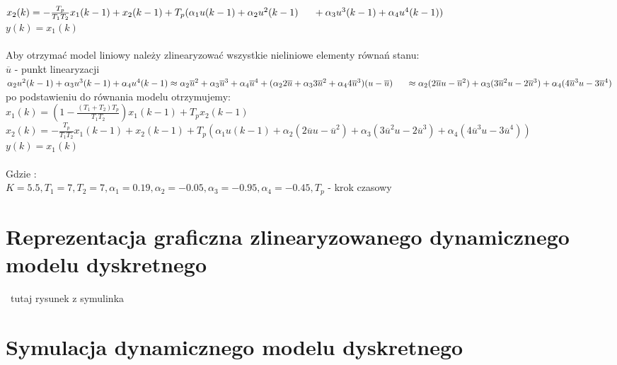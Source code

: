 \documentclass[a4paper, 11pt]{article}
\begin{document}
$x_2(k) = - \frac{T_p}{T_1T_2}x_1(k-1) + x_2(k-1) + T_p(\alpha_1u(k-1)+\alpha_2u^2(k-1)\\
	\indent	+ \alpha_3u^3(k-1)+\alpha_4u^4(k-1))$
\\

$y(k) = x_1(k)$
\\
\\

\noindent Aby otrzymać model liniowy należy zlinearyzować wszystkie nieliniowe elementy równań stanu:
\\

$\overline{u}$ - punkt linearyzacji 
\\

$\alpha_2u^2(k-1)+ \alpha_3u^3(k-1)+\alpha_4u^4(k-1) \approx \alpha_2\overline{u}^2 + \alpha_3\overline{u}^3 + \alpha_4\overline{u}^4 + (\alpha_22\overline{u} + \alpha_33\overline{u}^2 + \alpha_44\overline{u}^3)(u-\overline{u})  \\ \indent \approx \alpha_2(2\overline{u}u - \overline{u}^2)+ \alpha_3(3\overline{u}^2u-2\overline{u}^3) + \alpha_4(4\overline{u}^3u - 3\overline{u}^4)$
\\

\noindent po podstawieniu do równania modelu otrzymujemy: 
\\

$x_1(k) =(1-\frac{(T_1 + T_2)T_p}{T_1T_2})x_1(k-1)+T_px_2(k-1) $
\\

$x_2(k) = - \frac{T_p}{T_1T_2}x_1(k-1) + x_2(k-1) + T_p(\alpha_1u(k-1)+\alpha_2(2\overline{u}u - \overline{u}^2)+ \alpha_3(3\overline{u}^2u-2\overline{u}^3) + \alpha_4(4\overline{u}^3u - 3\overline{u}^4))$
\\

$y(k) = x_1(k)$\\
\\
Gdzie : \\

$K  = 5.5, T_1 = 7, T_2 = 7, \alpha_1 = 0.19, \alpha_2 = -0.05, \alpha_3 = -0.95, \alpha_4 = -0.45, T_p$ - krok czasowy
\\

\section{Reprezentacja graficzna zlinearyzowanego dynamicznego modelu dyskretnego}\
tutaj rysunek z symulinka

\section{Symulacja dynamicznego modelu dyskretnego}
\end{document}
